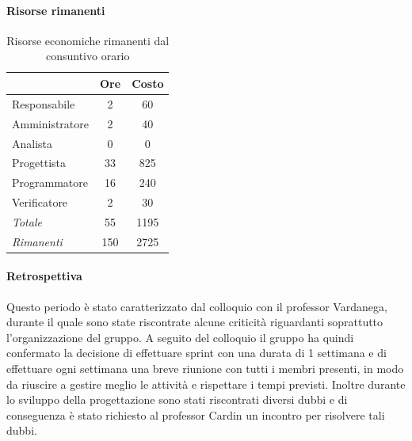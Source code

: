 \documentclass[a4paper,12pt]{article}
\begin{document}
            \paragraph{Risorse rimanenti}
                \begin{table}[H]
                \centering
                \caption{Risorse economiche rimanenti dal consuntivo orario}
                \begin{tabular}{|l|c|c|}
                \hline
                    \rowcolor{lightgray}{\textbf{Ruolo}} & {\textbf{Ore}} & {\textbf{Costo}}\\
                \hline
                    Responsabile & 2 & 60\\
                \hline
                    Amministratore & 2 & 40\\
                \hline
                    Analista & 0 & 0\\
                \hline
                    Progettista & 33 & 825\\
                \hline
                    Programmatore & 16 & 240\\
                \hline
                    Verificatore & 2 & 30\\
                \hline
                    \rowcolor{lightgray}\textit{Totale} & 55 & 1195\\
                \hline
                    \rowcolor{lightgray}\textit{Rimanenti} & 150 & 2725\\
                \hline
                \end{tabular}
                \end{table}
                
            \paragraph{Retrospettiva}
            Questo periodo è stato caratterizzato dal colloquio con il professor Vardanega, durante il quale sono state riscontrate alcune criticità riguardanti soprattutto l'organizzazione del gruppo.
            A seguito del colloquio il gruppo ha quindi confermato la decisione di effettuare sprint con una durata di 1 settimana e di effettuare ogni settimana una breve riunione con tutti i membri presenti, in modo da riuscire a gestire meglio le attività e rispettare i tempi previsti.
            Inoltre durante lo sviluppo della progettazione sono stati riscontrati diversi dubbi e di conseguenza è stato richiesto al professor Cardin un incontro per risolvere tali dubbi.
\end{document}
